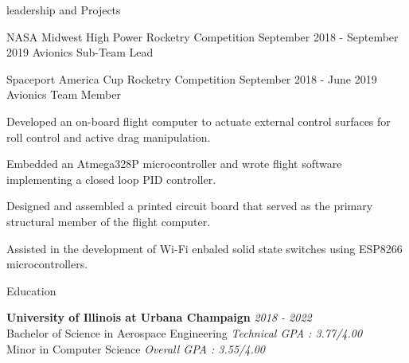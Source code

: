 \documentclass{resume} %
\begin{document}
\begin{rSection} {leadership and Projects}
\begin{rSubsection} {NASA Midwest High Power Rocketry Competition} {September 2018 - September 2019} {Avionics Sub-Team Lead}
        \end{rSubsection}

        \smallskip


        \begin{rSubsection} {Spaceport America Cup Rocketry Competition} {September 2018 - June 2019} {Avionics Team Member}

            \item Developed an on-board flight computer to actuate external control surfaces for roll control and active drag manipulation.
            \item Embedded an Atmega328P microcontroller and wrote flight software implementing a closed loop PID controller.
            \item Designed and assembled a printed circuit board that served as the primary structural member of the flight computer.
            \item Assisted in the development of Wi-Fi enbaled solid state switches using ESP8266 microcontrollers.
        \end{rSubsection}

    \end{rSection}


    \begin{rSection}{Education}

        {\textbf{University of Illinois at Urbana Champaign}} \hfill {\em 2018 - 2022}\\
        Bachelor of Science in Aerospace Engineering \hfill {\em Technical GPA : 3.77/4.00} \\
        Minor in Computer Science \hfill {\em Overall GPA : 3.55/4.00}


    \end{rSection}
\end{document}
